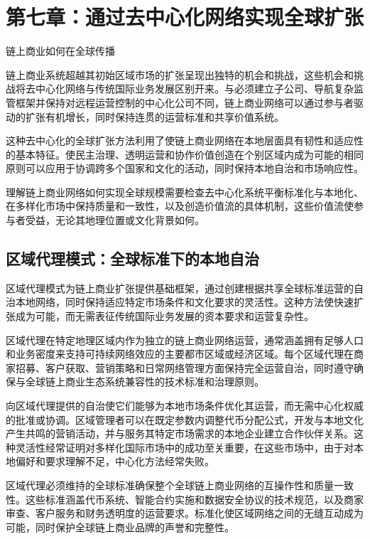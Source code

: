 \documentclass[
  Letterpaper,
]{scrbook}
\begin{document}
\chapter{第七章：通过去中心化网络实现全球扩张}\label{sec-global-expansion}

链上商业如何在全球传播

链上商业系统超越其初始区域市场的扩张呈现出独特的机会和挑战，这些机会和挑战将去中心化网络与传统国际业务发展区别开来。与必须建立子公司、导航复杂监管框架并保持对远程运营控制的中心化公司不同，链上商业网络可以通过参与者驱动的扩张有机增长，同时保持连贯的运营标准和共享价值系统。

这种去中心化的全球扩张方法利用了使链上商业网络在本地层面具有韧性和适应性的基本特征。使民主治理、透明运营和协作价值创造在个别区域内成为可能的相同原则可以应用于协调跨多个国家和文化的活动，同时保持本地自治和市场响应性。

理解链上商业网络如何实现全球规模需要检查去中心化系统平衡标准化与本地化、在多样化市场中保持质量和一致性，以及创造价值流的具体机制，这些价值流使参与者受益，无论其地理位置或文化背景如何。

\section{区域代理模式：全球标准下的本地自治}\label{ux533aux57dfux4ee3ux7406ux6a21ux5f0fux5168ux7403ux6807ux51c6ux4e0bux7684ux672cux5730ux81eaux6cbb}

区域代理模式为链上商业扩张提供基础框架，通过创建根据共享全球标准运营的自治本地网络，同时保持适应特定市场条件和文化要求的灵活性。这种方法使快速扩张成为可能，而无需表征传统国际业务发展的资本要求和运营复杂性。

区域代理在特定地理区域内作为独立的链上商业网络运营，通常涵盖拥有足够人口和业务密度来支持可持续网络效应的主要都市区域或经济区域。每个区域代理在商家招募、客户获取、营销策略和日常网络管理方面保持完全运营自治，同时遵守确保与全球链上商业生态系统兼容性的技术标准和治理原则。

向区域代理提供的自治使它们能够为本地市场条件优化其运营，而无需中心化权威的批准或协调。区域管理者可以在既定参数内调整代币分配公式，开发与本地文化产生共鸣的营销活动，并与服务其特定市场需求的本地企业建立合作伙伴关系。这种灵活性经常证明对多样化国际市场中的成功至关重要，在这些市场中，由于对本地偏好和要求理解不足，中心化方法经常失败。

区域代理必须维持的全球标准确保整个全球链上商业网络的互操作性和质量一致性。这些标准涵盖代币系统、智能合约实施和数据安全协议的技术规范，以及商家审查、客户服务和财务透明度的运营要求。标准化使区域网络之间的无缝互动成为可能，同时保护全球链上商业品牌的声誉和完整性。
\end{document}
